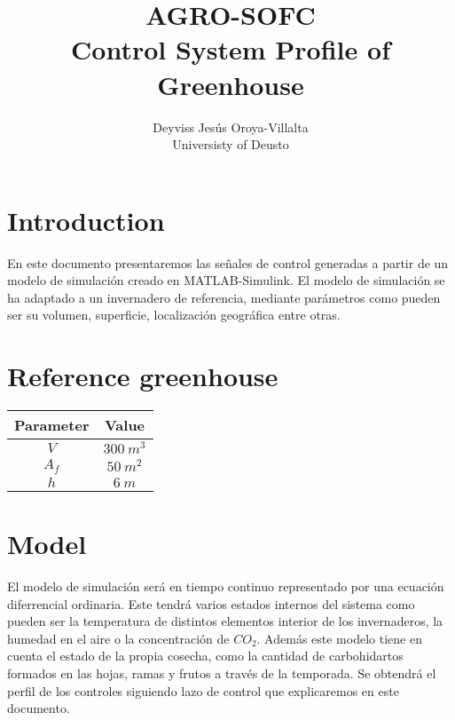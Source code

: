 \documentclass{article}
\author{Deyviss Jesús Oroya-Villalta \\
Universisty of Deusto}
\title{\textbf{AGRO-SOFC\\Control System Profile of Greenhouse}}
\begin{document}
    \maketitle
    \section{Introduction}

    En este documento presentaremos las señales de control generadas a partir de un modelo de simulación creado en MATLAB-Simulink. 
    El modelo de simulación se ha adaptado a un invernadero de referencia, mediante parámetros como pueden ser su volumen, superficie, localización geográfica entre otras.  
    \section{Reference greenhouse}
 
    
    \begin{table}[ht!]
        \centering
        \begin{tabular}{|c|c|}
            \hline  
            Parameter & Value \\ \hline \hline
            $V$   & $300 \ m^3$  \\ 
            $A_f$ & $50 \ m^2$ \\
            $h$   & $6 \ m $ \\ 
            \hline 
        \end{tabular}
    \end{table}

    \section{Model}

    El modelo de simulación será en tiempo continuo representado por una ecuación diferrencial ordinaria. Este tendrá varios estados internos del sistema como pueden ser la temperatura de distintos elementos interior de los invernaderos, la humedad en el aire o la concentración de $CO_2$. Además este modelo tiene en cuenta el estado de la propia cosecha, como la cantidad de carbohidartos formados en las hojas, ramas y frutos a través de la temporada. Se obtendrá el perfil de los controles siguiendo lazo de control que explicaremos en este documento.
\end{document}
